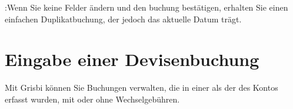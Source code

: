 \Note{}:Wenn Sie keine Felder ändern und den buchung bestätigen, erhalten Sie einen einfachen Duplikatbuchung, der jedoch das aktuelle Datum trägt.


\section{Eingabe einer Devisenbuchung\label{transactions-currencies}}

Mit Grisbi können Sie Buchungen verwalten, die in einer  als der des Kontos erfasst wurden, mit oder ohne Wechselgebühren.

